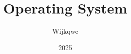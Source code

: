 
\usepackage{amsmath}
\usepackage{array}
\usepackage{amssymb}

\usepackage{geometry}

\usepackage{multirow}

\geometry{scale=0.8}

\title{Operating System}
\author{Wijkqwe}
\date{2025}
